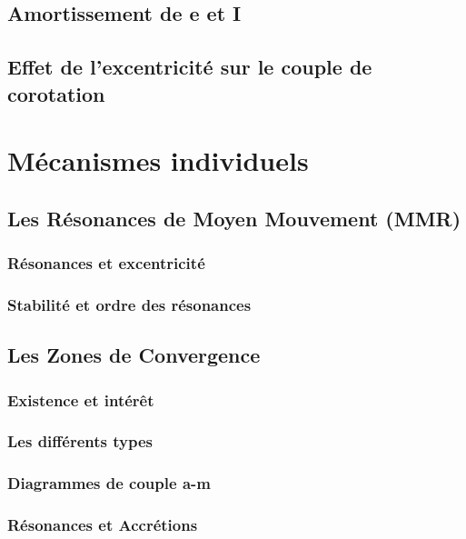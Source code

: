 \documentclass[logos,parttoc]{bordeaux-thesis}
\begin{document}
\section{Amortissement de e et I}
\section{Effet de l'excentricité sur le couple de corotation}

\chapter{Mécanismes individuels}
\section{Les Résonances de Moyen Mouvement (MMR)}
\subsection{Résonances et excentricité}
\subsection{Stabilité et ordre des résonances}

\section{Les Zones de Convergence}
\subsection{Existence et intérêt}
\subsection{Les différents types}
\subsection{Diagrammes de couple a-m}
\subsection{Résonances et Accrétions}
\end{document}
